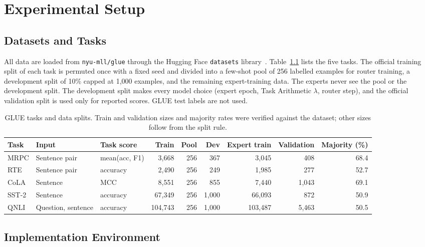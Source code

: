 \chapter{Experimental Setup}

\section{Datasets and Tasks}

All data are loaded from \texttt{nyu-mll/glue} through the Hugging Face \texttt{datasets} library~\cite{lhoest2021datasets}. Table~\ref{tab:data} lists the five tasks. The official training split of each task is permuted once with a fixed seed and divided into a few-shot pool of 256 labelled examples for router training, a development split of 10\% capped at 1,000 examples, and the remaining expert-training data. The experts never see the pool or the development split. The development split makes every model choice (expert epoch, Task Arithmetic $\lambda$, router step), and the official validation split is used only for reported scores. GLUE test labels are not used.

\begin{table}[htbp]
  \centering\tablestyle
  \caption{GLUE tasks and data splits. Train and validation sizes and majority rates were verified against the dataset; other sizes follow from the split rule.}
  \label{tab:data}
  \begin{tabularx}{\linewidth}{l X l r r r r r r}
    \toprule
    Task & Input & Task score & Train & Pool & Dev & Expert train & Validation & Majority (\%)\\
    \midrule
    MRPC & Sentence pair & mean(acc, F1) & 3,668 & 256 & 367 & 3,045 & 408 & 68.4\\
    RTE & Sentence pair & accuracy & 2,490 & 256 & 249 & 1,985 & 277 & 52.7\\
    CoLA & Sentence & MCC & 8,551 & 256 & 855 & 7,440 & 1,043 & 69.1\\
    SST-2 & Sentence & accuracy & 67,349 & 256 & 1,000 & 66,093 & 872 & 50.9\\
    QNLI & Question, sentence & accuracy & 104,743 & 256 & 1,000 & 103,487 & 5,463 & 50.5\\
    \bottomrule
  \end{tabularx}
\end{table}

\section{Implementation Environment}

